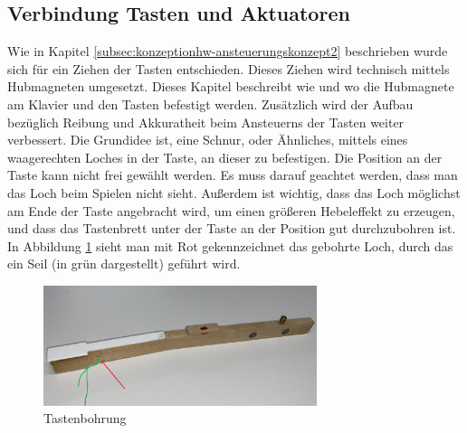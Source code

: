 \subsection{Verbindung Tasten und Aktuatoren} \label{subsec:VerbindungTastenAktuatoren}

Wie in Kapitel \ref{subsec:konzeptionhw-ansteuerungskonzept2} beschrieben wurde sich für ein Ziehen der Tasten entschieden.
Dieses Ziehen wird technisch mittels Hubmagneten umgesetzt. \newline
Dieses Kapitel beschreibt wie und wo die Hubmagnete am Klavier und den Tasten befestigt werden. %
Zusätzlich wird der Aufbau bezüglich Reibung und Akkuratheit beim Ansteuerns der Tasten weiter verbessert. %
\newline
Die Grundidee ist, eine Schnur, oder Ähnliches, mittels eines waagerechten Loches in der Taste, an dieser zu befestigen. %
Die Position an der Taste kann nicht frei gewählt werden. Es muss darauf geachtet werden,
dass man das Loch beim Spielen nicht sieht. %
Außerdem ist wichtig, dass das Loch möglichst am Ende der Taste angebracht wird, um einen größeren Hebeleffekt zu erzeugen,
und dass das Tastenbrett unter der Taste an der Position gut durchzubohren ist.
In Abbildung \ref{img:Tastenbohrung} sieht man mit Rot gekennzeichnet das gebohrte Loch, durch das ein Seil (in grün dargestellt) geführt wird.

\begin{figure}[htbp]
    \centering
    \includegraphics[width=8cm]{img/Taste_schraeg.jpg}
    \caption{Tastenbohrung}
    \label{img:Tastenbohrung}
\end{figure}


